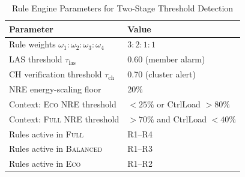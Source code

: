 \begin{table}[!t]
  \caption{Rule Engine Parameters for Two-Stage Threshold Detection}
  \label{tab:rule-params}
  \centering
  \scriptsize
  \setlength{\tabcolsep}{4pt}
  \renewcommand{\arraystretch}{1.08}
  \begin{tabular}{@{}ll@{}}
    \toprule
    \textbf{Parameter} & \textbf{Value} \\
    \midrule
    Rule weights $\omega_1{:}\omega_2{:}\omega_3{:}\omega_4$ & $3:2:1:1$ \\
    LAS threshold $\tau_{\mathrm{las}}$ & 0.60 (member alarm) \\
    CH verification threshold $\tau_{\mathrm{ch}}$ & 0.70 (cluster alert) \\
    NRE energy-scaling floor & 20\% \\
    Context: \textsc{Eco} NRE threshold & $<25\%$ or CtrlLoad $>80\%$ \\
    Context: \textsc{Full} NRE threshold & $>70\%$ and CtrlLoad $<40\%$ \\
    Rules active in \textsc{Full} & R1--R4 \\
    Rules active in \textsc{Balanced} & R1--R3 \\
    Rules active in \textsc{Eco} & R1--R2 \\
    \bottomrule
  \end{tabular}
\end{table}
